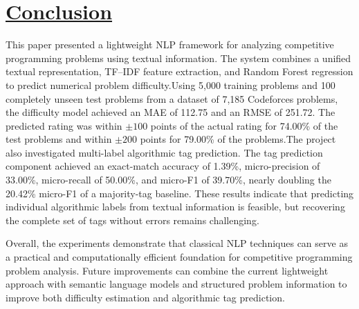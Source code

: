\documentclass[conference]{IEEEtran}
\begin{document}

\section{\underline{Conclusion}}

This paper presented a lightweight NLP framework for analyzing competitive
programming problems using textual information. The system combines a
unified textual representation, TF--IDF feature extraction, and Random
Forest regression to predict numerical problem difficulty.Using 5,000 training problems and 100 completely unseen test problems from
a dataset of 7,185 Codeforces problems, the difficulty model achieved an
MAE of 112.75 and an RMSE of 251.72. The predicted rating was within
$\pm100$ points of the actual rating for 74.00\% of the test problems and
within $\pm200$ points for 79.00\% of the problems.The project also investigated multi-label algorithmic tag prediction. The
tag prediction component achieved an exact-match accuracy of 1.39\%,
micro-precision of 33.00\%, micro-recall of 50.00\%, and micro-F1 of
39.70\%, nearly doubling the
20.42\% micro-F1 of a majority-tag baseline. These results indicate that
predicting individual algorithmic labels from textual information is
feasible, but recovering the complete set of tags without errors remains
challenging.

Overall, the experiments demonstrate that classical NLP techniques can
serve as a practical and computationally efficient foundation for
competitive programming problem analysis. Future improvements can combine
the current lightweight approach with semantic language models and
structured problem information to improve both difficulty estimation and
algorithmic tag prediction.


\balance
\end{document}
